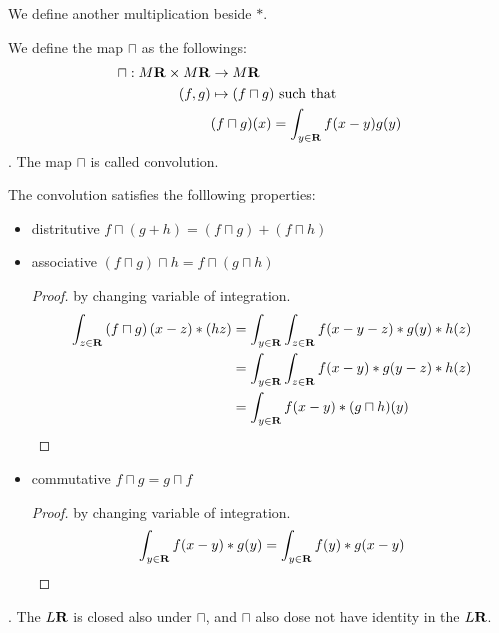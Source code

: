 We define another multiplication beside $*$.
\begin{definition}[Convolution]
We define the map $\sqcap$ as the followings:
\begin{equation}\begin{split}
	\sqcap: M{\mathbf{R}}\times M{\mathbf{R}} &\to M{\mathbf{R}} \\
	(f,g) &\mapsto (f\sqcap g) \text{ such that} \\
	& (f\sqcap g)(x) = \int_{y\in{\mathbf{R}}}f(x-y)g(y) \\
\end{split}\end{equation}
. The map $\sqcap$ is called convolution.
\end{definition}
The convolution satisfies the folllowing properties:
\begin{itemize}
\item distritutive $f\sqcap(g+ h) = (f\sqcap g)+ (f\sqcap h)$
\item associative $(f\sqcap g)\sqcap h = f\sqcap(g\sqcap h)$
	\begin{proof}
		by changing variable of integration.
		\begin{equation*}\begin{split}
			\int_{{z}\in{\mathbf{R}}}\left({f\sqcap g}\right)\left({x-z}\right)*\left({hz}\right)
				&= \int_{{y}\in{\mathbf{R}}}\int_{{z}\in{\mathbf{R}}}f(x-y-z)*g(y)*h(z) \\
				&= \int_{{y}\in{\mathbf{R}}}\int_{{z}\in{\mathbf{R}}}f(x-y)*g(y-z)*h(z) \\
				&= \int_{{y}\in{\mathbf{R}}}f(x-y)*(g\sqcap h)(y) \\
		\end{split}\end{equation*}
	\end{proof}
\item commutative $f\sqcap g = g\sqcap f$
	\begin{proof}
		by changing variable of integration.
		\begin{equation*}\begin{split}
			\int_{{y}\in{\mathbf{R}}}f(x-y)*g(y) &= \int_{{y}\in{\mathbf{R}}}f(y)*g(x-y) \\
		\end{split}\end{equation*}
	\end{proof}
\end{itemize}
.
The $L{\mathbf{R}}$ is closed also under $\sqcap$, and $\sqcap$ also dose not
have identity in the $L{\mathbf{R}}$.

